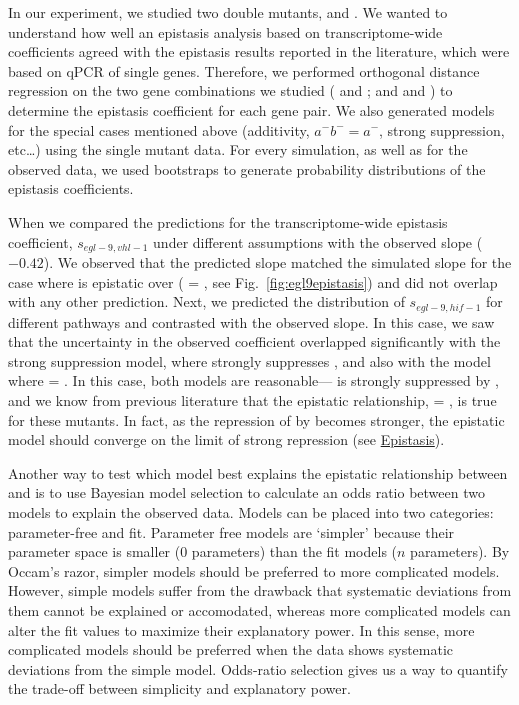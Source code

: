 In our experiment, we studied two double mutants, \eglhif{} and \eglvhl{}.
We wanted to understand how well an epistasis analysis based on transcriptome-wide
coefficients agreed with the epistasis results reported in the literature, which
were based on qPCR of single genes. Therefore, we performed orthogonal distance
regression on the two gene combinations we studied ( and
; and  and ) to determine the epistasis
coefficient for each gene pair. We also generated models for the special cases
mentioned above (additivity, $a^-b^-=a^-$, strong suppression, etc\ldots) using
the single mutant data. For every simulation, as well as for the observed data,
we used bootstraps to generate probability distributions of the epistasis
coefficients.

When we compared the predictions for the transcriptome-wide epistasis coefficient,
$s_{egl-9,vhl-1}$ under different assumptions with the observed slope ($-0.42$). We
observed that the predicted slope matched the simulated slope for the case where
 is epistatic over  (\egl{} = \eglvhl{}, see
Fig.~\ref{fig:egl9epistasis}) and did not overlap with any other prediction.
Next, we predicted the distribution of $s_{egl-9,hif-1}$ for different pathways
and contrasted with the observed slope. In this case, we saw that the uncertainty
in the observed coefficient overlapped significantly with the strong suppression
model, where \eglp{} strongly suppresses \hifp{}, and also with the model where
\hif{} = \eglhif{}. In this case, both models are reasonable---\hifp{} is strongly
suppressed by \eglp{}, and we know from previous literature that the epistatic
relationship, \hif{} = \eglhif{}, is true for these mutants. In fact, as the
repression of \hifp{} by \eglp{} becomes stronger, the epistatic model should converge
on the limit of strong repression (see
\href{https://wormlabcaltech.github.io/mprsq/analysis_notebooks/epistasis_6.html}
{Epistasis}).

Another way to test which model best explains the epistatic relationship between
 and  is to use Bayesian model selection to calculate
an odds ratio between two models to explain the observed data. Models can be placed
into two categories: parameter-free and fit. Parameter free models are `simpler'
because their parameter space is smaller (0 parameters) than the fit models ($n$
parameters). By Occam's razor, simpler models should be preferred to more
complicated models. However, simple models suffer from the drawback that
systematic deviations from them cannot be explained or accomodated, whereas more
complicated models can alter the fit values to maximize their explanatory power.
In this sense, more complicated models should be preferred when the data shows
systematic deviations from the simple model. Odds-ratio selection gives us a way
to quantify the trade-off between simplicity and explanatory power.

